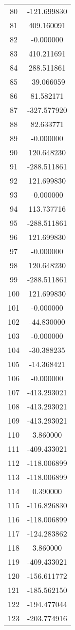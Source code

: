 \documentclass[12pt]{article}
\begin{document}
\begin{longtable}{@{}cc@{}}
80 & -121.699830 \\
81 & 409.160091 \\
82 & -0.000000 \\
83 & 410.211691 \\
84 & 288.511861 \\
85 & -39.066059 \\
86 & 81.582171 \\
87 & -327.577920 \\
88 & 82.633771 \\
89 & -0.000000 \\
90 & 120.648230 \\
91 & -288.511861 \\
92 & 121.699830 \\
93 & -0.000000 \\
94 & 113.737716 \\
95 & -288.511861 \\
96 & 121.699830 \\
97 & -0.000000 \\
98 & 120.648230 \\
99 & -288.511861 \\
100 & 121.699830 \\
101 & -0.000000 \\
102 & -44.830000 \\
103 & -0.000000 \\
104 & -30.388235 \\
105 & -14.368421 \\
106 & -0.000000 \\
107 & -413.293021 \\
108 & -413.293021 \\
109 & -413.293021 \\
110 & 3.860000 \\
111 & -409.433021 \\
112 & -118.006899 \\
113 & -118.006899 \\
114 & 0.390000 \\
115 & -116.826830 \\
116 & -118.006899 \\
117 & -124.283862 \\
118 & 3.860000 \\
119 & -409.433021 \\
120 & -156.611772 \\
121 & -185.562150 \\
122 & -194.477044 \\
123 & -203.774916 \\

\end{longtable}
\end{document}
